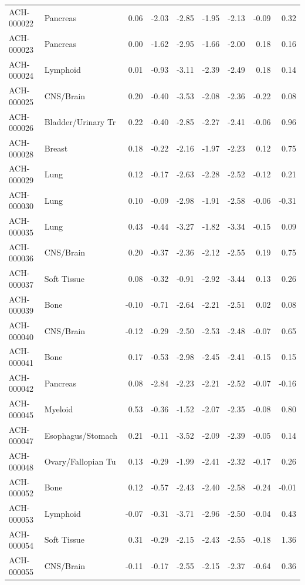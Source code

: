 \begin{footnotesize}
\begin{longtable}{llrrrrrrr}
ACH-000022 & Pancreas & 0.06 & -2.03 & -2.85 & -1.95 & -2.13 & -0.09 & 0.32 \\
ACH-000023 & Pancreas & 0.00 & -1.62 & -2.95 & -1.66 & -2.00 & 0.18 & 0.16 \\
ACH-000024 & Lymphoid & 0.01 & -0.93 & -3.11 & -2.39 & -2.49 & 0.18 & 0.14 \\
ACH-000025 & CNS/Brain & 0.20 & -0.40 & -3.53 & -2.08 & -2.36 & -0.22 & 0.08 \\
ACH-000026 & Bladder/Urinary Tr & 0.22 & -0.40 & -2.85 & -2.27 & -2.41 & -0.06 & 0.96 \\
ACH-000028 & Breast & 0.18 & -0.22 & -2.16 & -1.97 & -2.23 & 0.12 & 0.75 \\
ACH-000029 & Lung & 0.12 & -0.17 & -2.63 & -2.28 & -2.52 & -0.12 & 0.21 \\
ACH-000030 & Lung & 0.10 & -0.09 & -2.98 & -1.91 & -2.58 & -0.06 & -0.31 \\
ACH-000035 & Lung & 0.43 & -0.44 & -3.27 & -1.82 & -3.34 & -0.15 & 0.09 \\
ACH-000036 & CNS/Brain & 0.20 & -0.37 & -2.36 & -2.12 & -2.55 & 0.19 & 0.75 \\
ACH-000037 & Soft Tissue & 0.08 & -0.32 & -0.91 & -2.92 & -3.44 & 0.13 & 0.26 \\
ACH-000039 & Bone & -0.10 & -0.71 & -2.64 & -2.21 & -2.51 & 0.02 & 0.08 \\
ACH-000040 & CNS/Brain & -0.12 & -0.29 & -2.50 & -2.53 & -2.48 & -0.07 & 0.65 \\
ACH-000041 & Bone & 0.17 & -0.53 & -2.98 & -2.45 & -2.41 & -0.15 & 0.15 \\
ACH-000042 & Pancreas & 0.08 & -2.84 & -2.23 & -2.21 & -2.52 & -0.07 & -0.16 \\
ACH-000045 & Myeloid & 0.53 & -0.36 & -1.52 & -2.07 & -2.35 & -0.08 & 0.80 \\
ACH-000047 & Esophagus/Stomach & 0.21 & -0.11 & -3.52 & -2.09 & -2.39 & -0.05 & 0.14 \\
ACH-000048 & Ovary/Fallopian Tu & 0.13 & -0.29 & -1.99 & -2.41 & -2.32 & -0.17 & 0.26 \\
ACH-000052 & Bone & 0.12 & -0.57 & -2.43 & -2.40 & -2.58 & -0.24 & -0.01 \\
ACH-000053 & Lymphoid & -0.07 & -0.31 & -3.71 & -2.96 & -2.50 & -0.04 & 0.43 \\
ACH-000054 & Soft Tissue & 0.31 & -0.29 & -2.15 & -2.43 & -2.55 & -0.18 & 1.36 \\
ACH-000055 & CNS/Brain & -0.11 & -0.17 & -2.55 & -2.15 & -2.37 & -0.64 & 0.36 \\

\end{longtable}
\end{footnotesize}
